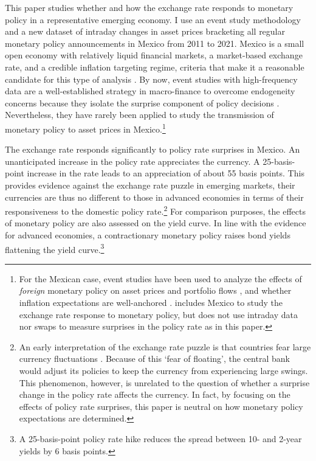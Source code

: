 \documentclass[a4paper,12pt]{article} 		%
\begin{document}
This paper studies whether and how the exchange rate responds to monetary policy in a representative emerging economy. I use an event study methodology and a new dataset of intraday changes in asset prices bracketing all regular monetary policy announcements in Mexico from 2011 to 2021. 
Mexico is a small open economy with relatively liquid financial markets, a market-based exchange rate, and a credible inflation targeting regime, criteria that make it a reasonable candidate for this type of analysis \parencite{KearnsManners:2006,PenningsRamayandiTang:2015}. By now, event studies with high-frequency data are a well-established strategy in macro-finance to overcome endogeneity concerns because they isolate the surprise component of policy decisions \parencite{GurkaynakWright:2013,NakamuraSteinsson:2018JEP}. Nevertheless, they have rarely been applied to study the transmission of monetary policy to asset prices in Mexico.\footnote{ For the Mexican case, event studies have been used to analyze the effects of \textit{foreign} monetary policy on asset prices \parencite{BZP:2001,Rosa:2011Eco,HausmanWongswan:2011,KearnsSchrimpfXia:2018} and portfolio flows \parencite{HernandezVega:2021}, and whether inflation expectations are well-anchored \parencite{DePooter_etal:2014}. \textcite{Kohlscheen:2014} includes Mexico to study the exchange rate response to monetary policy, but does not use intraday data nor swaps to measure surprises in the policy rate as in this paper.} 

The exchange rate responds significantly to policy rate surprises in Mexico. An unanticipated increase in the policy rate appreciates the currency. A 25-basis-point increase in the rate leads to an appreciation of about 55 basis points. This provides evidence against the exchange rate puzzle in emerging markets, their currencies are thus no different to those in advanced economies in terms of their responsiveness to the domestic policy rate.\footnote{An early interpretation of the exchange rate puzzle is that countries fear large currency fluctuations \parencite{CalvoReinhart:2002}. Because of this `fear of floating', the central bank would adjust its policies to keep the currency from experiencing large swings. This phenomenon, however, is unrelated to the question of whether a surprise change in the policy rate affects the currency. In fact, by focusing on the effects of policy rate surprises, this paper is neutral on how monetary policy expectations are determined.} For comparison purposes, the effects of monetary policy are also assessed on the yield curve. In line with the evidence for advanced economies, a contractionary monetary policy raises bond yields flattening the yield curve.\footnote{A 25-basis-point policy rate hike reduces the spread between 10- and 2-year yields by 6 basis points.} 
\end{document}
